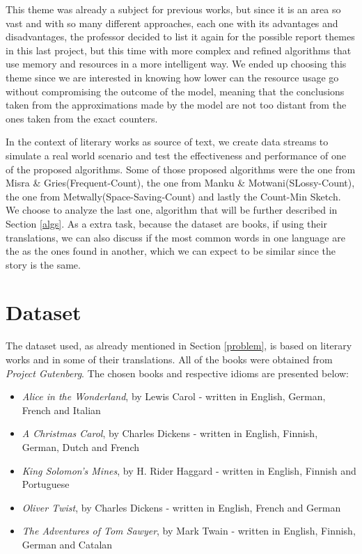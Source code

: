 \documentclass[shortpaper]{revdetua}
\begin{document}
This theme was already a subject for previous works, but since it is an area so vast and with so many different approaches, each one with its advantages and disadvantages, the professor decided to list it again for the possible report themes in this last project, but this time with more complex and refined algorithms that use memory and resources in a more intelligent way. We ended up choosing this theme since we are interested in knowing how lower can the resource usage go without compromising the outcome of the model, meaning that the conclusions taken from the approximations made by the model are not too distant from the ones taken from the exact counters.

In the context of literary works as source of text, we create data streams to simulate a real world scenario and test the effectiveness and performance of one of the proposed algorithms. Some of those proposed algorithms were the one from Misra \& Gries(Frequent-Count), the one from Manku \& Motwani(SLossy-Count), the one from Metwally(Space-Saving-Count) and lastly the Count-Min Sketch. We choose to analyze the last one, algorithm that will be further described in Section \ref{algs}.
As a extra task, because the dataset are books, if using their translations, we can also discuss if the most common words in one language are the as the ones found in another, which we can expect to be similar since the story is the same.


\section{Dataset}

The dataset used, as already mentioned in Section \ref{problem}, is based on literary works and in some of their translations. All of the books were obtained from \textit{Project Gutenberg}\cite{gutenberg}. The chosen books and respective idioms are presented below:

\begin{itemize}
    \item \textit{Alice in the Wonderland}, by Lewis Carol - written in English, German, French and Italian
    \item \textit{A Christmas Carol}, by Charles Dickens - written in English, Finnish, German, Dutch and French
    \item \textit{King Solomon's Mines}, by H. Rider Haggard - written in English, Finnish and Portuguese
    \item \textit{Oliver Twist}, by Charles Dickens - written in English, French and German
    \item \textit{The Adventures of Tom Sawyer}, by Mark Twain - written in English, Finnish, German and Catalan
\end{itemize}
\end{document}
